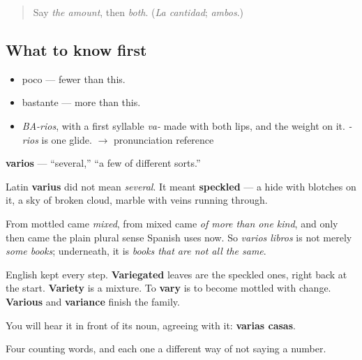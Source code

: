 \label{lesson:ES-C351-varios}



\begin{quote}
Say \emph{the amount}, then \emph{both}. (\emph{La cantidad}; \emph{ambos}.)
\end{quote}

\subsection*{What to know first}
\begin{itemize}
\raggedright
  \item poco — fewer than this.
  \item bastante — more than this.
\end{itemize}

\begin{sounds}
\begin{itemize}
\raggedright
  \item \emph{BA-rios}, with a first syllable \emph{va-} made with both lips, and the weight on it. \emph{-rios} is one glide. $\to$ pronunciation reference
\end{itemize}
\end{sounds}

\begin{cousinweb}
\textbf{varios} — \textquotedblleft{}several,\textquotedblright{} \textquotedblleft{}a few of different sorts.\textquotedblright{}

Latin \textbf{varius} did not mean \emph{several}. It meant \textbf{speckled} — a hide with blotches on it, a sky of broken cloud, marble with veins running through.

From mottled came \emph{mixed}, from mixed came \emph{of more than one kind}, and only then came the plain plural sense Spanish uses now. So \emph{varios libros} is not merely \emph{some books}; underneath, it is \emph{books that are not all the same}.

English kept every step. \textbf{Variegated} leaves are the speckled ones, right back at the start. \textbf{Variety} is a mixture. To \textbf{vary} is to become mottled with change. \textbf{Various} and \textbf{variance} finish the family.

You will hear it in front of its noun, agreeing with it: \textbf{varias casas}.
\end{cousinweb}

\begin{grammarlens}[title={What you've built}]
Four counting words, and each one a different way of not saying a number.
\end{grammarlens}

